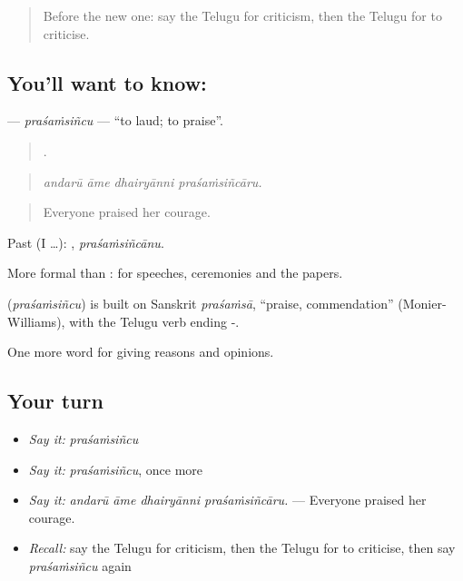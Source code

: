 \label{lesson:TE-C387-prasamsincu}



\begin{quote}
Before the new one: say the Telugu for criticism, then the Telugu for to criticise.
\end{quote}

\subsection*{You'll want to know: }
\textbf{} — \emph{praśaṁsiñcu} — \textquotedblleft{}to laud; to praise\textquotedblright{}.

\begin{quote}
   .
\end{quote}

\begin{quote}
\emph{andarū āme dhairyānni praśaṁsiñcāru.}
\end{quote}

\begin{quote}
Everyone praised her courage.
\end{quote}

Past (I …): , \emph{praśaṁsiñcānu}.

More formal than : for speeches, ceremonies and the papers.

\begin{cousinweb}
\textbf{} (\emph{praśaṁsiñcu}) is built on Sanskrit \emph{praśaṁsā}, \textquotedblleft{}praise, commendation\textquotedblright{} (Monier-Williams), with the Telugu verb ending -.
\end{cousinweb}

\begin{grammarlens}[title={What you've built}]
One more word for giving reasons and opinions.
\end{grammarlens}

\subsection*{Your turn}
\begin{itemize}
\raggedright
  \item \emph{Say it:} \emph{praśaṁsiñcu}
  \item \emph{Say it:} \emph{praśaṁsiñcu}, once more
  \item \emph{Say it:} \emph{andarū āme dhairyānni praśaṁsiñcāru.} — Everyone praised her courage.
  \item \emph{Recall:} say the Telugu for criticism, then the Telugu for to criticise, then say \emph{praśaṁsiñcu} again
\end{itemize}

